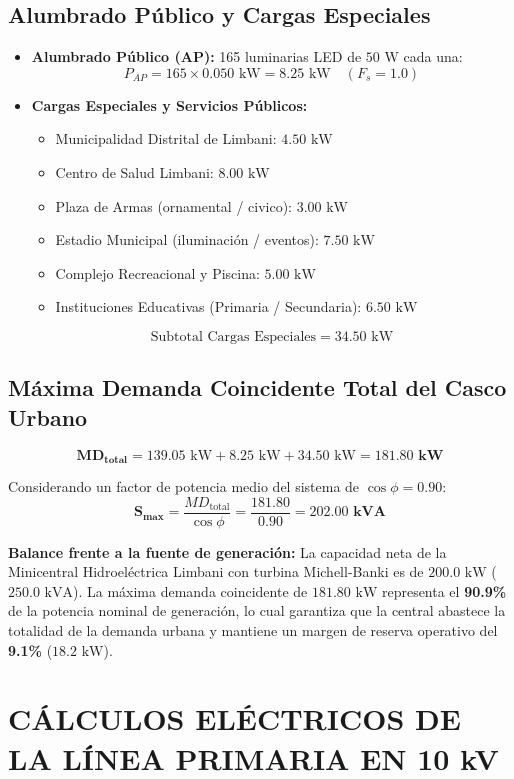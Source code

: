 \subsection{Alumbrado Público y Cargas Especiales}
\begin{itemize}
  \item \textbf{Alumbrado Público (AP):} 165 luminarias LED de $50\text{ W}$ cada una:
    $$P_{AP} = 165 \times 0.050\text{ kW} = 8.25\text{ kW} \quad (F_s = 1.0)$$
  \item \textbf{Cargas Especiales y Servicios Públicos:}
    \begin{itemize}
      \item Municipalidad Distrital de Limbani: $4.50\text{ kW}$
      \item Centro de Salud Limbani: $8.00\text{ kW}$
      \item Plaza de Armas (ornamental / civico): $3.00\text{ kW}$
      \item Estadio Municipal (iluminación / eventos): $7.50\text{ kW}$
      \item Complejo Recreacional y Piscina: $5.00\text{ kW}$
      \item Instituciones Educativas (Primaria / Secundaria): $6.50\text{ kW}$
    \end{itemize}
    $$\text{Subtotal Cargas Especiales} = 34.50\text{ kW}$$
\end{itemize}

\subsection{Máxima Demanda Coincidente Total del Casco Urbano}
$$\mathbf{MD_{\text{total}}} = 139.05\text{ kW} + 8.25\text{ kW} + 34.50\text{ kW} = \mathbf{181.80\text{ kW}}$$

Considerando un factor de potencia medio del sistema de $\cos\phi = 0.90$:
$$\mathbf{S_{\text{max}}} = \frac{MD_{\text{total}}}{\cos\phi} = \frac{181.80}{0.90} = \mathbf{202.00\text{ kVA}}$$

\textbf{Balance frente a la fuente de generación:}  
La capacidad neta de la Minicentral Hidroeléctrica Limbani con turbina Michell-Banki es de $200.0\text{ kW}$ ($250.0\text{ kVA}$). La máxima demanda coincidente de $181.80\text{ kW}$ representa el \textbf{90.9\%} de la potencia nominal de generación, lo cual garantiza que la central abastece la totalidad de la demanda urbana y mantiene un margen de reserva operativo del \textbf{9.1\%} ($18.2\text{ kW}$).

\section{CÁLCULOS ELÉCTRICOS DE LA LÍNEA PRIMARIA EN 10 kV}

